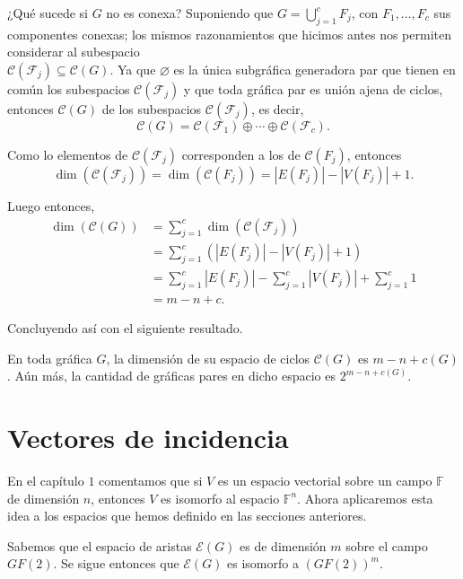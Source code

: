 ¿Qué sucede si $G$ no es conexa? Suponiendo que $G = \bigcup_{j=1}^{c}F_{j}$, con $F_{1}, \ldots, F_{c}$ sus componentes conexas; los mismos razonamientos que hicimos antes nos permiten considerar al subespacio \\$\mathcal{C}(\mathcal{F}_{j}) \subseteq \mathcal{C}(G)$. Ya que $\varnothing$ es la única subgráfica generadora par que tienen en común los subespacios $\mathcal{C}(\mathcal{F}_{j})$ y que toda gráfica par es unión ajena de ciclos, entonces $\mathcal{C}(G)$ de los subespacios $\mathcal{C}(\mathcal{F}_{j})$, es decir, $$\mathcal{C}(G)= \mathcal{C}(\mathcal{F}_{1}) \oplus \cdots \oplus \mathcal{C}(\mathcal{F}_{c}).$$

Como lo elementos de $\mathcal{C}(\mathcal{F}_{j})$ corresponden a los de $\mathcal{C}(F_{j})$, entonces $$\dim(\mathcal{C}(\mathcal{F}_{j})) = \dim(\mathcal{C}(F_{j})) = |E(F_{j})|-|V(F_{j})| + 1.$$

Luego entonces, 
\begin{align*}
    \dim(\mathcal{C}(G)) &= \sum_{j = 1}^{c}\dim(\mathcal{C}(\mathcal{F}_{j}))\\
    &= \sum_{j = 1}^{c} (|E(F_{j})|-|V(F_{j})| + 1) \\
    &= \sum_{j=1}^{c} |E(F_{j})| - \sum_{j=1}^{c} |V(F_{j})| + \sum_{j=1}^{c} 1\\
    &= m - n + c.
\end{align*}

Concluyendo así con el siguiente resultado.

\begin{teo}\label{teo:dimciclos}
En toda gráfica $G$, la dimensión de su espacio de ciclos $\mathcal{C}(G)$ es $m -n +c(G)$. Aún más, la cantidad de gráficas pares en dicho espacio es $2^{m-n+c(G)}$.
\end{teo}


\section{Vectores de incidencia}

En el capítulo $1$ comentamos que si $V$ es un espacio vectorial sobre un campo $\mathbb{F}$ de dimensión $n$, entonces $V$ es isomorfo al espacio $\mathbb{F}^n$. Ahora aplicaremos esta idea a los espacios que hemos definido en las secciones anteriores.

Sabemos que el espacio de aristas $\mathcal{E}(G)$ es de dimensión $m$ sobre el campo $GF(2)$. Se sigue entonces que $\mathcal{E}(G)$ es isomorfo a $(GF(2))^{m}$. 

